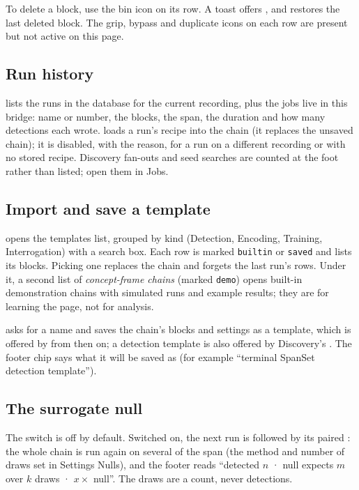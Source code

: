 To delete a block, use the bin icon on its row. A toast offers , and
 restores the last deleted block. The grip, bypass and duplicate
icons on each row are present but not active on this page.

\subsection*{Run history}
 lists the runs in the database for the current recording, plus the jobs live in this
bridge: name or number, the blocks, the span, the duration and how many detections each wrote.
 loads a run's recipe into the chain (it replaces the unsaved chain); it is
disabled, with the reason, for a run on a different recording or with no stored recipe.
Discovery fan-outs and seed searches are counted at the foot rather than listed; open them in Jobs.

\subsection*{Import and save a template}
 opens the templates list, grouped by kind (Detection, Encoding, Training,
Interrogation) with a search box. Each row is marked \texttt{builtin} or \texttt{saved} and lists
its blocks. Picking one replaces the chain and forgets the last run's rows. Under it, a second list
of \emph{concept-frame chains} (marked \texttt{demo}) opens built-in demonstration chains with
simulated runs and example results; they are for learning the page, not for analysis.

 asks for a name and saves the chain's blocks and settings as a template, which
is offered by  from then on; a detection template is also offered by Discovery's
. The footer chip says what it
will be saved as (for example ``terminal SpanSet \textrightarrow{} detection template'').

\subsection*{The surrogate null}
The  switch is off by default. Switched on, the next run is followed by its
paired : the whole chain is run again on several  of
the span (the method and number of draws set in Settings \textrightarrow{} Nulls), and the footer
reads ``detected \(n\) · null expects \(m\) over \(k\) draws · \(x\times\) null''. The draws are a
count, never detections.

